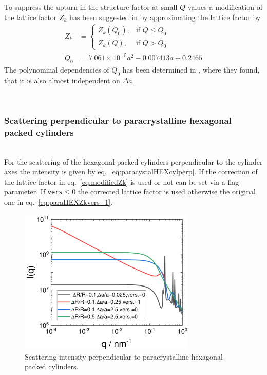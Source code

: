 To suppress the upturn in the structure factor at small $Q$-values a modification of the lattice factor $Z_k$  has been suggested in \cite{Penttilae2019} by approximating the lattice factor by
\begin{align}\label{eq:modifiedZk}
  Z_k &=
  \begin{cases}
        Z_k(Q_0), & 	\text{if $Q \leq  Q_0$}  \\
        Z_k(Q) 	, & 	\text{if $Q >     Q_0$}
  \end{cases} \\
  Q_0 &= 7.061\times 10^{-5} a^2 - 0.007413a + 0.2465
\end{align}
The polynominal dependencies of $Q_0$ has been determined in \cite{Penttilae2019}, where they found, that it is also almost independent on $\Delta a$.

~\\
\subsubsection{Scattering perpendicular to paracrystalline hexagonal packed cylinders} ~\\

For the scattering of the hexagonal packed cylinders perpendicular to the cylinder axes the intensity is given by eq.\ \ref{eq:paracystalHEXcylperp}. If the correction of the lattice factor in eq.\ \ref{eq:modifiedZk} is used or not can be set via a flag parameter. If \texttt{vers}$\le0$ the corrected lattice factor is used otherwise the original one in eq.\ \ref{eq:paraHEXZkvers_1}.

\begin{figure}[htb]
\begin{center}
\includegraphics[width=0.75\textwidth]{../images/form_factor/cylindrical_obj/paracrystHEXcyl_perp.pdf}
\end{center}
\caption{Scattering intensity perpendicular to paracrystalline hexagonal packed cylinders.}
\label{fig:paracrystHEXcyl_perpIQ}
\end{figure}

